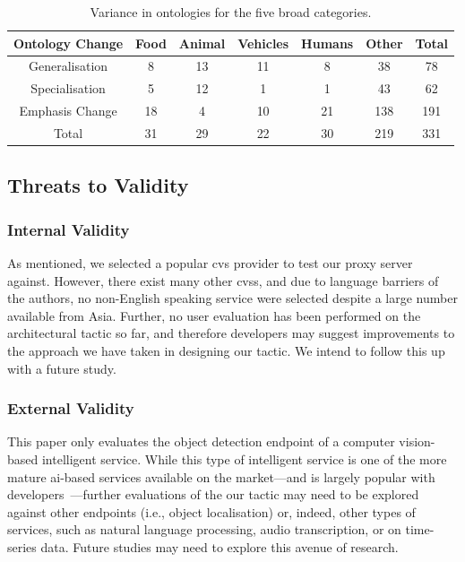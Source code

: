 
\begin{table}[]
    \centering
    \caption[Variance in ontologies]{Variance in ontologies for the five broad categories.}
    \label{tab:ontology-variance}
    \begin{tabular}{c|ccccc|c}
        \toprule
        \textbf{Ontology Change}
        & \textbf{Food}
        & \textbf{Animal} 
        & \textbf{Vehicles} 
        & \textbf{Humans} 
        & \textbf{Other} 
        & \textbf{Total}\\
        \midrule
        Generalisation & 8&13&11&8&38&78\\
        Specialisation & 5&12&1&1&43&62\\
        Emphasis Change & 18&4&10&21&138&191\\
        \midrule
        Total & 31&29&22&30&219&331\\
        \bottomrule
    \end{tabular}
\end{table}

\subsection{Threats to Validity}
\label{sec:threats}

\subsubsection{Internal Validity} As mentioned, we selected a popular \gls{cvs} provider to test our proxy server against. However, there exist many other \glspl{cvs}, and due to language barriers of the authors, no non-English speaking service were selected despite a large number available from Asia. Further, no user evaluation has been performed on the architectural tactic so far, and therefore developers may suggest improvements to the approach we have taken in designing our tactic. We intend to follow this up with a future study.

\subsubsection{External Validity}
This paper only evaluates the object detection endpoint of a computer vision-based intelligent service. While this type of intelligent service is one of the more mature \gls{ai}-based services available on the market---and is largely popular with developers~\citep{Cummaudo:2020icse}---further evaluations of the our tactic may need to be explored against other endpoints (i.e., object localisation) or, indeed, other types of services, such as natural language processing, audio transcription, or on time-series data. Future studies may need to explore this avenue of research.

